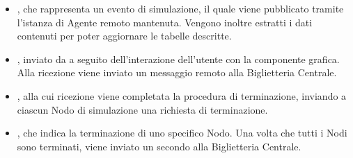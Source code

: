 	\begin{itemize}
		\item {}, che rappresenta un evento di simulazione, il quale viene pubblicato tramite l'istanza di Agente remoto mantenuta. Vengono inoltre estratti i dati contenuti per poter aggiornare le tabelle descritte.
		\item {}, inviato da  a seguito dell'interazione dell'utente con la componente grafica. Alla ricezione viene inviato un messaggio remoto  alla Biglietteria Centrale.
		\item {}, alla cui ricezione viene completata la procedura di terminazione, inviando a ciascun Nodo di simulazione una richiesta di terminazione. 
		\item {}, che indica la terminazione di uno specifico Nodo. Una volta che tutti i Nodi sono terminati, viene inviato un secondo  alla Biglietteria Centrale. 
	\end{itemize}

